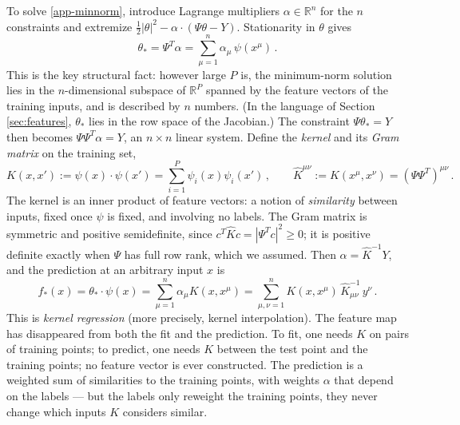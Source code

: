 \documentclass[11pt]{article}
\newcommand{\R}{\mathbb{R}}
\begin{document}
To solve \eqref{app-minnorm}, introduce Lagrange multipliers $\alpha\in\R^n$ for the $n$ constraints and extremize $\frac{1}{2}|\theta|^2 - \alpha\cdot(\Psi\theta - Y)$. Stationarity in $\theta$ gives
%
\begin{equation}
    \theta_* = \Psi^T\alpha = \sum_{\mu=1}^n \alpha_\mu\,\psi(x^\mu)\,. \label{app-representer}
\end{equation}
%
This is the key structural fact: however large $P$ is, the minimum-norm solution lies in the $n$-dimensional subspace of $\R^P$ spanned by the feature vectors of the training inputs, and is described by $n$ numbers. (In the language of Section \ref{sec:features}, $\theta_*$ lies in the row space of the Jacobian.) The constraint $\Psi\theta_* = Y$ then becomes $\Psi\Psi^T\alpha = Y$, an $n\times n$ linear system. Define the \emph{kernel} and its \emph{Gram matrix} on the training set,
%
\begin{equation}
    K(x,x') := \psi(x)\cdot\psi(x') = \sum_{i=1}^P \psi_i(x)\psi_i(x')\,,\qquad
    \hat K^{\mu\nu} := K(x^\mu,x^\nu) = (\Psi\Psi^T)^{\mu\nu}\,. \label{app-kernel}
\end{equation}
%
The kernel is an inner product of feature vectors: a notion of \emph{similarity} between inputs, fixed once $\psi$ is fixed, and involving no labels. The Gram matrix is symmetric and positive semidefinite, since $c^T\hat K c = |\Psi^Tc|^2\geq 0$; it is positive definite exactly when $\Psi$ has full row rank, which we assumed. Then $\alpha = \hat K^{-1}Y$, and the prediction at an arbitrary input $x$ is
%
\begin{equation}
    f_*(x) = \theta_*\cdot\psi(x) = \sum_{\mu=1}^n \alpha_\mu K(x,x^\mu) = \sum_{\mu,\nu=1}^n K(x,x^\mu)\,\hat K^{-1}_{\mu\nu}\,y^\nu\,. \label{app-kernel-reg}
\end{equation}
%
This is \emph{kernel regression} (more precisely, kernel interpolation). The feature map has disappeared from both the fit and the prediction. To fit, one needs $K$ on pairs of training points; to predict, one needs $K$ between the test point and the training points; no feature vector is ever constructed. The prediction is a weighted sum of similarities to the training points, with weights $\alpha$ that depend on the labels --- but the labels only reweight the training points, they never change which inputs $K$ considers similar.
\end{document}
